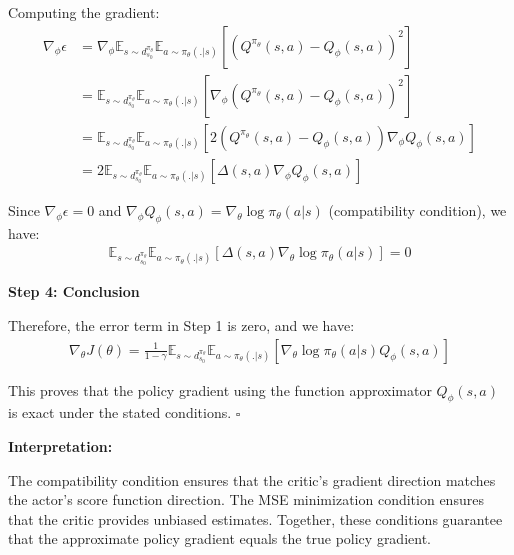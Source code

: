 Computing the gradient:
\begin{align}
\nabla_\phi \epsilon &= \nabla_\phi \mathbb{E}_{s \sim d^{\pi_\theta}_{s_0}}\mathbb{E}_{a \sim \pi_\theta(.|s)} [(Q^{\pi_\theta} (s, a) - Q_\phi(s, a))^2] \\
&= \mathbb{E}_{s \sim d^{\pi_\theta}_{s_0}}\mathbb{E}_{a \sim \pi_\theta(.|s)} [\nabla_\phi (Q^{\pi_\theta} (s, a) - Q_\phi(s, a))^2] \\
&= \mathbb{E}_{s \sim d^{\pi_\theta}_{s_0}}\mathbb{E}_{a \sim \pi_\theta(.|s)} [2(Q^{\pi_\theta} (s, a) - Q_\phi(s, a)) \nabla_\phi Q_\phi(s, a)] \\
&= 2\mathbb{E}_{s \sim d^{\pi_\theta}_{s_0}}\mathbb{E}_{a \sim \pi_\theta(.|s)} [\Delta(s,a) \nabla_\phi Q_\phi(s, a)]
\end{align}

Since $\nabla_\phi \epsilon = 0$ and $\nabla_\phi Q_\phi(s, a) = \nabla_\theta \log \pi_\theta (a|s)$ (compatibility condition), we have:
\begin{align}
\mathbb{E}_{s \sim d^{\pi_\theta}_{s_0}}\mathbb{E}_{a \sim \pi_\theta(.|s)} [\Delta(s,a) \nabla_\theta \log \pi_\theta (a|s)] = 0
\end{align}

\textbf{Step 4: Conclusion}

Therefore, the error term in Step 1 is zero, and we have:
\begin{align}
\nabla_\theta J(\theta) = \frac{1}{1-\gamma}\mathbb{E}_{s \sim d^{\pi_\theta}_{s_0}}\mathbb{E}_{a \sim \pi_\theta(.|s)} [\nabla_\theta \log \pi_\theta (a|s) Q_\phi (s, a)]
\end{align}

This proves that the policy gradient using the function approximator $Q_\phi(s,a)$ is exact under the stated conditions. $\square$

\textbf{Interpretation:}

The compatibility condition ensures that the critic's gradient direction matches the actor's score function direction. The MSE minimization condition ensures that the critic provides unbiased estimates. Together, these conditions guarantee that the approximate policy gradient equals the true policy gradient.